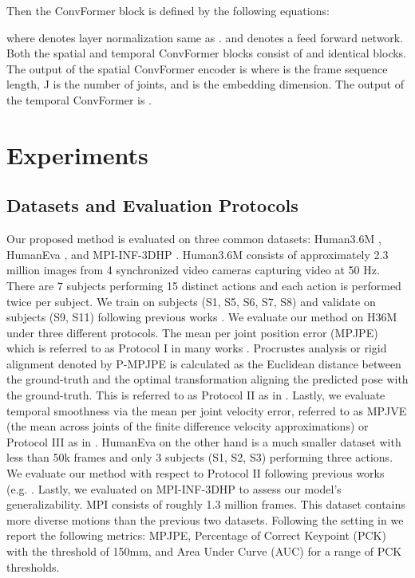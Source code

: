 \documentclass{article}
\begin{document}
Then the ConvFormer block is defined by the following equations:

where  denotes layer normalization same as \cite{KDWHUBMDHGUZ21,YCWYSJTFY21}. and  denotes a feed forward network. Both the spatial and temporal ConvFormer blocks consist of  and  identical blocks. The output of the spatial ConvFormer encoder is  where   is the frame sequence length, J is the number of joints, and  is the embedding dimension. The output of the temporal ConvFormer is . 


\section{Experiments}


\subsection{Datasets and Evaluation Protocols}
Our proposed method is evaluated on three common datasets: Human3.6M \cite{IPOS13}, HumanEva \cite{SBB10}, and MPI-INF-3DHP \cite{mono-3dhp2017}. Human3.6M consists of approximately 2.3 million images from 4 synchronized video cameras capturing video at 50 Hz. There are 7 subjects performing 15 distinct actions and each action is performed twice per subject. We train on subjects (S1, S5, S6, S7, S8) and validate on subjects (S9, S11) following previous works \cite{CFSZCL21,LL19,mono-3dhp2017,ZZMYCD21,li2022mhformer}. 
We evaluate our method on H36M under three different protocols. The mean per joint position error (MPJPE) which is referred to as Protocol I in many works \cite{FXWLZ18,KKA19,PFGA19}. Procrustes analysis or rigid alignment denoted by P-MPJPE is calculated as the Euclidean distance between the ground-truth and the optimal   transformation aligning the predicted pose with the ground-truth. This is referred to  as Protocol II as in \cite{MHRL17,RL18}. Lastly, we  evaluate temporal smoothness via the mean per joint velocity error, referred to as MPJVE (the mean across joints of the finite difference velocity approximations) or Protocol III as in \cite{PFGA19,WYXL20}. HumanEva on the other hand is a much smaller dataset with less than 50k frames and only 3 subjects (S1, S2, S3) performing three actions. We evaluate our method with respect to Protocol II following previous works  (e.g. \cite{PFGA19}. Lastly, we evaluated on MPI-INF-3DHP to assess our model's generalizability. MPI consists of roughly 1.3 million frames. This dataset contains more diverse motions than the previous two datasets. Following the setting in \cite{CFSZCL21,LL19,mono-3dhp2017,ZZMYCD21,li2022mhformer} we report the following metrics: MPJPE, Percentage of Correct Keypoint (PCK) with the threshold of 150mm, and Area Under Curve (AUC) for a range of PCK thresholds. 
\end{document}

